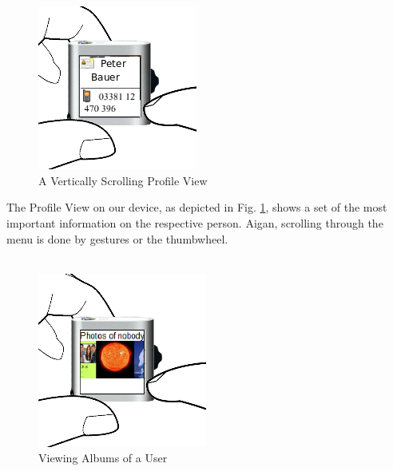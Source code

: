 \\
\\
%
\begin{figure}[h]
  \begin{center}
    \includegraphics[width=0.6\linewidth]{imgs/wt4.png}
  \end{center}
  \caption{A Vertically Scrolling Profile View}
  \label{fig:wt4}
\end{figure}
%
The Profile View on our device, as depicted in Fig. \ref{fig:wt4}, shows a set of the most important information on the respective person. Aigan, scrolling through the menu is done by gestures or the thumbwheel.
\\
\\
%
\begin{figure}[h]
  \begin{center}
    \includegraphics[width=0.6\linewidth]{imgs/wt5.png}
  \end{center}
  \caption{Viewing Albums of a User}
  \label{fig:wt5}
\end{figure}
